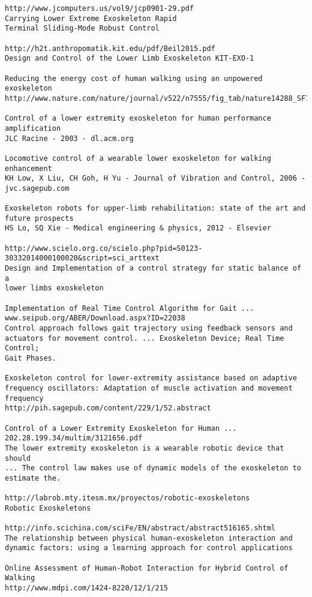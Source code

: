 \documentclass[letterpaper,12pt,fullpage]{article}
\begin{document}
\begin{verbatim}
http://www.jcomputers.us/vol9/jcp0901-29.pdf
Carrying Lower Extreme Exoskeleton Rapid
Terminal Sliding-Mode Robust Control

http://h2t.anthropomatik.kit.edu/pdf/Beil2015.pdf
Design and Control of the Lower Limb Exoskeleton KIT-EXO-1

Reducing the energy cost of human walking using an unpowered exoskeleton
http://www.nature.com/nature/journal/v522/n7555/fig_tab/nature14288_SF1.html

Control of a lower extremity exoskeleton for human performance
amplification
JLC Racine - 2003 - dl.acm.org

Locomotive control of a wearable lower exoskeleton for walking enhancement
KH Low, X Liu, CH Goh, H Yu - Journal of Vibration and Control, 2006 -
jvc.sagepub.com

Exoskeleton robots for upper-limb rehabilitation: state of the art and
future prospects
HS Lo, SQ Xie - Medical engineering & physics, 2012 - Elsevier

http://www.scielo.org.co/scielo.php?pid=S0123-30332014000100020&script=sci_arttext
Design and Implementation of a control strategy for static balance of a
lower limbs exoskeleton

Implementation of Real Time Control Algorithm for Gait ...
www.seipub.org/ABER/Download.aspx?ID=22038
Control approach follows gait trajectory using feedback sensors and
actuators for movement control. ... Exoskeleton Device; Real Time Control;
Gait Phases.

Exoskeleton control for lower-extremity assistance based on adaptive
frequency oscillators: Adaptation of muscle activation and movement
frequency
http://pih.sagepub.com/content/229/1/52.abstract

Control of a Lower Extremity Exoskeleton for Human ...
202.28.199.34/multim/3121656.pdf
The lower extremity exoskeleton is a wearable robotic device that should
... The control law makes use of dynamic models of the exoskeleton to
estimate the.

http://labrob.mty.itesm.mx/proyectos/robotic-exoskeletons
Robotic Exoskeletons

http://info.scichina.com/sciFe/EN/abstract/abstract516165.shtml
The relationship between physical human-exoskeleton interaction and
dynamic factors: using a learning approach for control applications

Online Assessment of Human-Robot Interaction for Hybrid Control of Walking
http://www.mdpi.com/1424-8220/12/1/215


\end{verbatim}
\end{document}

